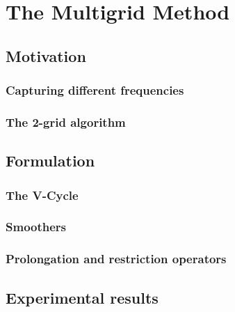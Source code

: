 \chapter{The Multigrid Method}

\section{Motivation}
	\subsection{Capturing different frequencies}
	\subsection{The 2-grid algorithm}
	
\section{Formulation}
	\subsection{The V-Cycle}
	\subsection{Smoothers}
	\subsection{Prolongation and restriction operators}
	
\section{Experimental results}